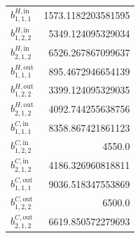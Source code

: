 \documentclass{article}%
\begin{document}
\begin{multicols*}{3}
\begin{supertabular}{lr}
	$b_{1,1,1}^{H,\text{in}}$ & 1573.1182203581595 \\%
	$b_{1,2,2}^{H,\text{in}}$ & 5349.124095329034 \\%
	$b_{2,1,2}^{H,\text{in}}$ & 6526.267867099637 \\%
	$b_{1,1,1}^{H,\text{out}}$ & 895.4672946654139 \\%
	$b_{1,2,2}^{H,\text{out}}$ & 3399.124095329035 \\%
	$b_{2,1,2}^{H,\text{out}}$ & 4092.744255638756 \\%
	$b_{1,1,1}^{C,\text{in}}$ & 8358.867421861123 \\%
	$b_{1,2,2}^{C,\text{in}}$ & 4550.0 \\%
	$b_{2,1,2}^{C,\text{in}}$ & 4186.326960818811 \\%
	$b_{1,1,1}^{C,\text{out}}$ & 9036.518347553869 \\%
	$b_{1,2,2}^{C,\text{out}}$ & 6500.0 \\%
	$b_{2,1,2}^{C,\text{out}}$ & 6619.850572279693 \\%
\end{supertabular}%
\end{multicols*}%
\clearpage%
\end{document}
